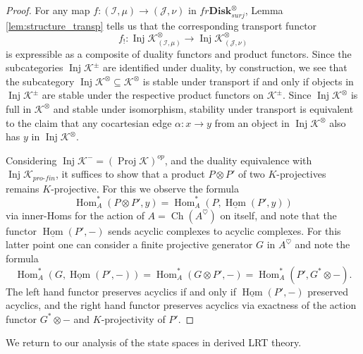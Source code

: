\documentclass[reqno]{amsart}
\theoremstyle{definition}
\newcommand{\mcl}[1]{\mathcal{#1}}
\newcommand{\msc}[1]{\mathscr{#1}}
\newcommand{\opn}[1]{\operatorname{#1}}
\newcommand{\ot}{\otimes}
\newcommand{\uHom}{\underline{\operatorname{Hom}}}
\newcommand{\Disk}{\mathbf{Disk}}
\newcommand{\pf}{pro\text{-}fin}
\DeclareMathOperator{\Hom}{Hom}
\renewcommand{\1}{\mathbf{1}}
\begin{document}
\begin{proof}
For any map $f:(\mcl{I},\mu)\to (\mcl{J},\nu)$ in $fr\Disk^{\ot}_{surj}$, Lemma \ref{lem:structure_transp} tells us that the corresponding transport functor
\[
f_!:\opn{Inj}\msc{K}^{\ot}_{(\mcl{I},\mu)}\to \opn{Inj}\msc{K}^{\ot}_{(\mcl{J},\nu)}
\]
is expressible as a composite of duality functors and product functors. Since the subcategories $\opn{Inj}\msc{K}^{\pm}$ are identified under duality, by construction, we see that the subcategory $\opn{Inj}\msc{K}^{\ot}\subseteq \msc{K}^{\ot}$ is stable under transport if and only if objects in $\opn{Inj}\msc{K}^{\pm}$ are stable under the respective product functors on $\msc{K}^{\pm}$. Since $\opn{Inj}\msc{K}^{\ot}$ is full in $\msc{K}^{\ot}$ and stable under isomorphism, stability under transport is equivalent to the claim that any cocartesian edge $\alpha:x\to y$ from an object in $\opn{Inj}\msc{K}^{\ot}$ also has $y$ in $\opn{Inj}\msc{K}^{\ot}$.
\par

Considering $\opn{Inj}\msc{K}^{-}=(\opn{Proj}\msc{K})^{op}$, and the duality equivalence with $\opn{Inj}\msc{K}_{\pf}$, it suffices to show that a product $P\ot P'$ of two $K$-projectives remains $K$-projective. For this we observe the formula
\[
\Hom^{\ast}_A(P\ot P',y)=\Hom^{\ast}_A(P,\uHom(P',y))
\]
via inner-Homs for the action of $A=\opn{Ch}(A^{\heartsuit})$ on itself, and note that the functor $\uHom(P',-)$ sends acyclic complexes to acyclic complexes. For this latter point one can consider a finite projective generator $G$ in $A^{\heartsuit}$ and note the formula
\[
\Hom_A^{\ast}(G,\uHom(P',-))=\Hom_A^{\ast}(G\ot P',-)=\Hom_A^{\ast}(P',G^{\ast}\ot-).
\]
The left hand functor preserves acyclics if and only if $\uHom(P',-)$ preserved acyclics, and the right hand functor preserves acyclics via exactness of the action functor $G^{\ast}\ot-$ and $K$-projectivity of $P'$.
\end{proof}

We return to our analysis of the state spaces in derived LRT theory.
\end{document}

